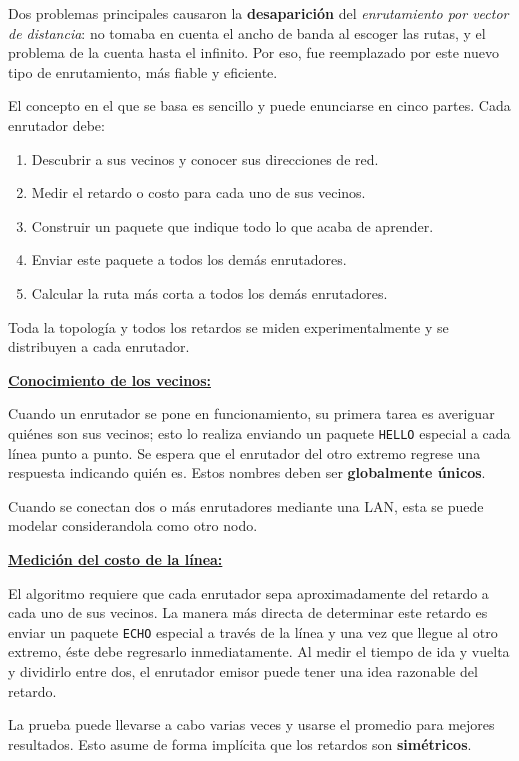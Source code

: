 \documentclass[10pt,a4paper]{article}
\begin{document}
Dos problemas principales causaron la \textbf{desaparición} del \textit{enrutamiento por vector de distancia}: no tomaba en cuenta el ancho de banda al escoger las rutas, y el problema de la cuenta hasta el infinito. Por eso, fue reemplazado por este nuevo tipo de enrutamiento, más fiable y eficiente.

El concepto en el que se basa es sencillo y puede enunciarse en cinco partes. Cada enrutador debe:
\begin{enumerate}
\item Descubrir a sus vecinos y conocer sus direcciones de red.
\item Medir el retardo o costo para cada uno de sus vecinos.
\item Construir un paquete que indique todo lo que acaba de aprender.
\item Enviar este paquete a todos los demás enrutadores.
\item Calcular la ruta más corta a todos los demás enrutadores.
\end{enumerate}

Toda la topología y todos los retardos se miden experimentalmente y se distribuyen a cada enrutador. 

\underline{\textbf{Conocimiento de los vecinos:}}

Cuando un enrutador se pone en funcionamiento, su primera tarea es averiguar quiénes son
sus vecinos; esto lo realiza enviando un paquete \texttt{HELLO} especial a cada línea punto a punto. Se espera que el enrutador del otro extremo regrese una respuesta indicando quién es. Estos nombres deben ser \textbf{globalmente únicos}.

Cuando se conectan dos o más enrutadores mediante una LAN, esta se puede modelar considerandola como otro nodo.

\underline{\textbf{Medición del costo de la línea:}}

El algoritmo requiere que cada enrutador sepa aproximadamente del retardo a cada uno de sus vecinos. La manera más directa de determinar este retardo es enviar un paquete \texttt{ECHO} especial a través de la línea y una vez que llegue al otro extremo, éste debe regresarlo inmediatamente. Al medir el tiempo de ida y vuelta y dividirlo entre dos, el enrutador emisor puede tener una idea razonable del retardo.

La prueba puede llevarse a cabo varias veces y usarse el promedio para mejores resultados. Esto asume de forma implícita que los retardos son \textbf{simétricos}.
\end{document}
